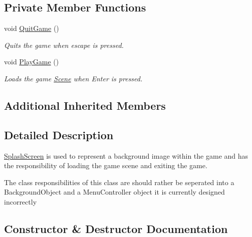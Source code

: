 \subsection*{Private Member Functions}
\begin{DoxyCompactItemize}
\item 
\mbox{\label{class_splash_screen_a5d9ac6cec631b24cc947dda245e7d151}} 
void \hyperlink{class_splash_screen_a5d9ac6cec631b24cc947dda245e7d151}{Quit\+Game} ()
\begin{DoxyCompactList}\small\item\em Quits the game when escape is pressed. \end{DoxyCompactList}\item 
\mbox{\label{class_splash_screen_a008328b85475bd01e326f94f20bf9217}} 
void \hyperlink{class_splash_screen_a008328b85475bd01e326f94f20bf9217}{Play\+Game} ()
\begin{DoxyCompactList}\small\item\em Loads the game \hyperlink{class_scene}{Scene} when Enter is pressed. \end{DoxyCompactList}\end{DoxyCompactItemize}
\subsection*{Additional Inherited Members}


\subsection{Detailed Description}
\hyperlink{class_splash_screen}{Splash\+Screen} is used to represent a background image within the game and has the responsibility of loading the game scene and exiting the game. 

The class responsibilities of this class are should rather be seperated into a Background\+Object and a Menu\+Controller object it is currently designed incorrectly 

\subsection{Constructor \& Destructor Documentation}
\mbox{\label{class_splash_screen_afefa0db946b214828634c7f2550677e6}} 
